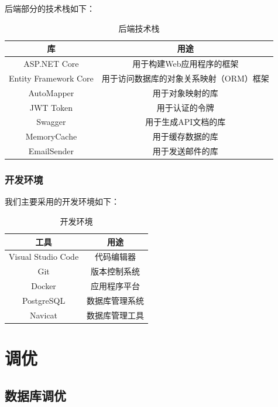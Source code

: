 \documentclass[UTF8,openany]{ctexbook}
\begin{document}
后端部分的技术栈如下：

\begin{table}[H]
    \centering
    \begin{tabular}{cc}
    \toprule
    \textbf{库} &  \textbf{用途} \\ 
    \midrule
    ASP.NET Core & 用于构建Web应用程序的框架 \\
    Entity Framework Core & 用于访问数据库的对象关系映射（ORM）框架 \\
    AutoMapper & 用于对象映射的库 \\
    JWT Token & 用于认证的令牌 \\
    Swagger & 用于生成API文档的库 \\
    MemoryCache & 用于缓存数据的库 \\
    EmailSender & 用于发送邮件的库 \\
    \bottomrule
    \end{tabular}
    \caption{后端技术栈}
\end{table}

\subsection{开发环境}

我们主要采用的开发环境如下：

\begin{table}[H]
    \centering
    \begin{tabular}{cc}
    \toprule
    \textbf{工具} &  \textbf{用途} \\ 
    \midrule
    Visual Studio Code & 代码编辑器 \\
    Git & 版本控制系统 \\
    Docker & 应用程序平台 \\
    PostgreSQL & 数据库管理系统 \\
    Navicat & 数据库管理工具 \\
    \bottomrule
    \end{tabular}
    \caption{开发环境}
\end{table}


\chapter{调优}
\label{sec:tuning}

\section{数据库调优}
\end{document}
